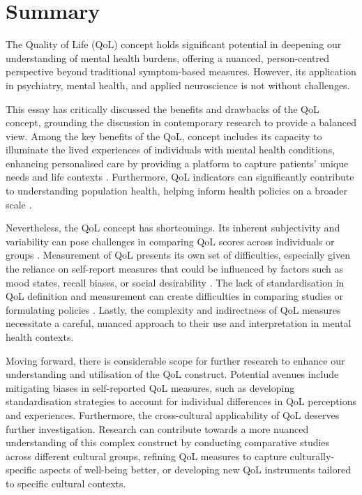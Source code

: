 \documentclass[10pt]{article}
\begin{document}
\begin{sloppypar}
  \section{Summary}
  \label{sec:summary}

  The Quality of Life (QoL) concept holds significant potential in deepening our understanding of mental health burdens, offering a nuanced, person-centred perspective beyond traditional symptom-based measures. However, its application in psychiatry, mental health, and applied neuroscience is not without challenges.

  This essay has critically discussed the benefits and drawbacks of the QoL concept, grounding the discussion in contemporary research to provide a balanced view. Among the key benefits of the QoL, concept includes its capacity to illuminate the lived experiences of individuals with mental health conditions, enhancing personalised care by providing a platform to capture patients' unique needs and life contexts \citep{dwamena_interventions_2012,endicott_quality_1993}. Furthermore, QoL indicators can significantly contribute to understanding population health, helping inform health policies on a broader scale \citep{gbd_2017_disease_and_injury_incidence_and_prevalence_collaborators_global_2018}.

  Nevertheless, the QoL concept has shortcomings. Its inherent subjectivity and variability can pose challenges in comparing QoL scores across individuals or groups \citep{skevington_expecting_2012}. Measurement of QoL presents its own set of difficulties, especially given the reliance on self-report measures that could be influenced by factors such as mood states, recall biases, or social desirability \citep{bowling_just_2005}. The lack of standardisation in QoL definition and measurement can create difficulties in comparing studies or formulating policies \citep{matarazzo_behavioral_1980}. Lastly, the complexity and indirectness of QoL measures necessitate a careful, nuanced approach to their use and interpretation in mental health contexts.

  Moving forward, there is considerable scope for further research to enhance our understanding and utilisation of the QoL construct. Potential avenues include mitigating biases in self-reported QoL measures, such as developing standardisation strategies to account for individual differences in QoL perceptions and experiences. Furthermore, the cross-cultural applicability of QoL deserves further investigation. Research can contribute towards a more nuanced understanding of this complex construct by conducting comparative studies across different cultural groups, refining QoL measures to capture culturally-specific aspects of well-being better, or developing new QoL instruments tailored to specific cultural contexts.


\end{sloppypar}
\end{document}
